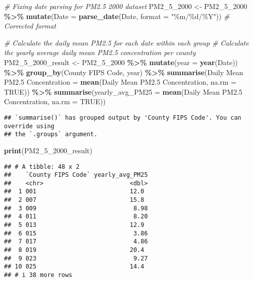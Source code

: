 \documentclass[
]{article}
\newenvironment{Shaded}{\begin{snugshade}}{\end{snugshade}}
\newcommand{\AttributeTok}[1]{\textcolor[rgb]{0.13,0.29,0.53}{#1}}
\newcommand{\CommentTok}[1]{\textcolor[rgb]{0.56,0.35,0.01}{\textit{#1}}}
\newcommand{\ConstantTok}[1]{\textcolor[rgb]{0.56,0.35,0.01}{#1}}
\newcommand{\FunctionTok}[1]{\textcolor[rgb]{0.13,0.29,0.53}{\textbf{#1}}}
\newcommand{\NormalTok}[1]{#1}
\newcommand{\OtherTok}[1]{\textcolor[rgb]{0.56,0.35,0.01}{#1}}
\newcommand{\SpecialCharTok}[1]{\textcolor[rgb]{0.81,0.36,0.00}{\textbf{#1}}}
\newcommand{\StringTok}[1]{\textcolor[rgb]{0.31,0.60,0.02}{#1}}
\begin{document}
\begin{Shaded}
\begin{Highlighting}[]
\CommentTok{\# Fixing date parsing for PM2.5 2000 dataset}
\NormalTok{PM2\_5\_2000 }\OtherTok{\textless{}{-}}\NormalTok{ PM2\_5\_2000 }\SpecialCharTok{\%\textgreater{}\%}
  \FunctionTok{mutate}\NormalTok{(}\AttributeTok{Date =} \FunctionTok{parse\_date}\NormalTok{(Date, }\AttributeTok{format =} \StringTok{"\%m/\%d/\%Y"}\NormalTok{)) }\CommentTok{\# Corrected format}

\CommentTok{\# Calculate the daily mean PM2.5 for each date within each group}
\CommentTok{\# Calculate the yearly average daily mean PM2.5 concentration per county}
\NormalTok{PM2\_5\_2000\_result }\OtherTok{\textless{}{-}}\NormalTok{ PM2\_5\_2000 }\SpecialCharTok{\%\textgreater{}\%}
  \FunctionTok{mutate}\NormalTok{(}\AttributeTok{year =} \FunctionTok{year}\NormalTok{(Date)) }\SpecialCharTok{\%\textgreater{}\%}
  \FunctionTok{group\_by}\NormalTok{(}\StringTok{\textasciigrave{}}\AttributeTok{County FIPS Code}\StringTok{\textasciigrave{}}\NormalTok{, year) }\SpecialCharTok{\%\textgreater{}\%}
  \FunctionTok{summarise}\NormalTok{(}\StringTok{\textasciigrave{}}\AttributeTok{Daily Mean PM2.5 Concentration}\StringTok{\textasciigrave{}} \OtherTok{=} \FunctionTok{mean}\NormalTok{(}\StringTok{\textasciigrave{}}\AttributeTok{Daily Mean PM2.5 Concentration}\StringTok{\textasciigrave{}}\NormalTok{, }\AttributeTok{na.rm =} \ConstantTok{TRUE}\NormalTok{)) }\SpecialCharTok{\%\textgreater{}\%}
  \FunctionTok{summarise}\NormalTok{(}\AttributeTok{yearly\_avg\_PM25 =} \FunctionTok{mean}\NormalTok{(}\StringTok{\textasciigrave{}}\AttributeTok{Daily Mean PM2.5 Concentration}\StringTok{\textasciigrave{}}\NormalTok{, }\AttributeTok{na.rm =} \ConstantTok{TRUE}\NormalTok{))}
\end{Highlighting}
\end{Shaded}

\begin{verbatim}
## `summarise()` has grouped output by 'County FIPS Code'. You can override using
## the `.groups` argument.
\end{verbatim}

\begin{Shaded}
\begin{Highlighting}[]
\FunctionTok{print}\NormalTok{(PM2\_5\_2000\_result)}
\end{Highlighting}
\end{Shaded}

\begin{verbatim}
## # A tibble: 48 x 2
##    `County FIPS Code` yearly_avg_PM25
##    <chr>                        <dbl>
##  1 001                          12.0 
##  2 007                          15.8 
##  3 009                           8.98
##  4 011                           8.20
##  5 013                          12.9 
##  6 015                           3.86
##  7 017                           4.86
##  8 019                          20.4 
##  9 023                           9.27
## 10 025                          14.4 
## # i 38 more rows
\end{verbatim}
\end{document}

